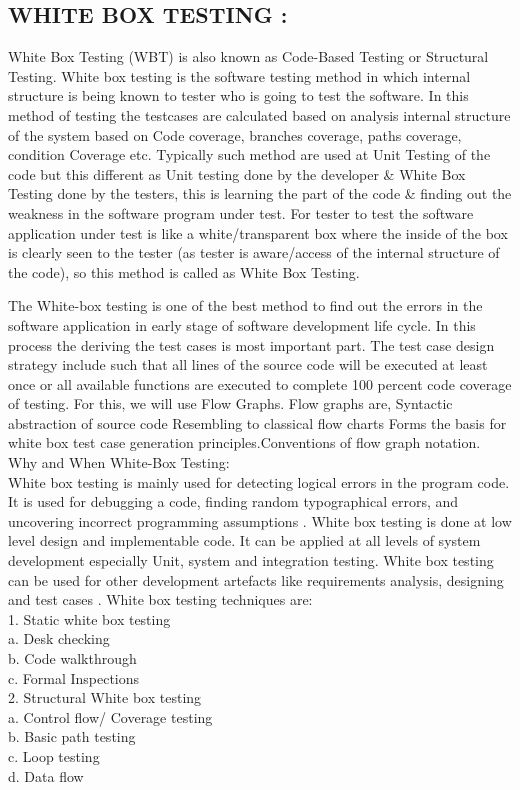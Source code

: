 \documentclass[a4paper,12pt]{article}
\begin{document}
\subsection{WHITE BOX TESTING :}
		 White Box Testing (WBT) is also known as Code-Based Testing or Structural Testing. White box testing is the software testing method in which internal structure is being known to tester who is going to test the software. In this method of testing the testcases are calculated based on analysis internal structure of the system based on Code coverage, branches coverage, paths coverage, condition Coverage etc. Typically such method are used at Unit Testing of the code but this different as Unit testing done by the developer \& White Box Testing done by the testers, this is learning the part of the code \& finding out the weakness in the software program under test.
For tester to test the software application under test is like a white/transparent box where the inside of the box is clearly seen to the tester (as tester is aware/access of the internal structure of the code), so this method is called as White Box Testing.

The White-box testing is one of the best method to find out the errors in the software application in early stage of software development life cycle. In this process the deriving the test cases is most important part. The test case design strategy include such that all lines of the source code will be executed at least once or all available functions are executed to complete 100 percent  code coverage of testing. For this, we will use Flow Graphs. Flow graphs are, Syntactic abstraction of source code Resembling to classical flow charts Forms the basis for white box test case generation principles.Conventions of flow graph notation. \\
Why and When White-Box Testing:\\
White box testing is mainly used for detecting logical errors in the program code. It is used for
debugging a code, finding random typographical errors, and uncovering incorrect programming
assumptions .
White box testing is done at low level design and implementable code. It can be applied at all levels of
system development especially Unit, system and integration testing. White box testing can be used for
other development artefacts like requirements analysis, designing and test cases .
White box testing techniques are:\\
1. Static white box testing\\
a. Desk checking\\
b. Code walkthrough\\
c. Formal Inspections\\
2. Structural White box testing\\
a. Control flow/ Coverage testing\\
b. Basic path testing\\
c. Loop testing\\
d. Data flow \\
\end{document}
